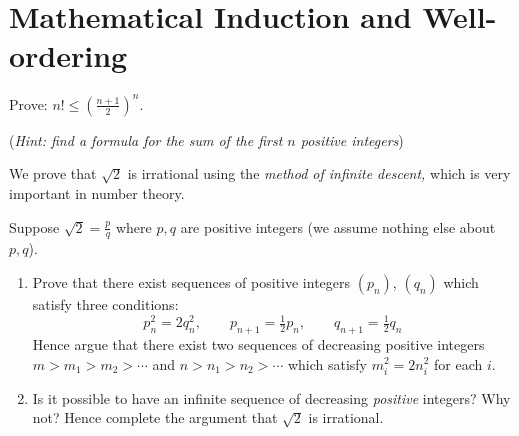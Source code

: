 \graphicspath{{notes/5induction/}}
\section{Mathematical Induction and Well-ordering}\label{sec:ind}

\iffalse
    \item Prove: $n! \le \left(\frac{n + 1}{2}\right)^n$.\par
     (\emph{Hint: find a formula for the sum of the first $n$ positive integers})
  
  \item We prove that $\sqrt 2$ is irrational using the \emph{method of infinite descent,} which is very important in number theory.\par
  Suppose $\sqrt 2=\frac pq$ where $p,q$ are positive integers (we assume nothing else about $p,q$).
  \begin{enumerate}
    \item Prove that there exist sequences of positive integers $(p_n)$, $(q_n)$ which satisfy three conditions:
    \[
    	p_n^2=2q_n^2,\qquad p_{n+1}=\tfrac 12p_n,\qquad q_{n+1}=\tfrac 12q_n
    \] 
    Hence argue that there exist two sequences of decreasing positive integers $m>m_1>m_2>\cdots$ and $n>n_1>n_2>\cdots$ which satisfy $m_i^2=2n_i^2$ for each $i$.
    
    \item Is it possible to have an infinite sequence of decreasing \emph{positive} integers? Why not? Hence complete the argument that $\sqrt 2$ is irrational.
	\end{enumerate}
  
%     

